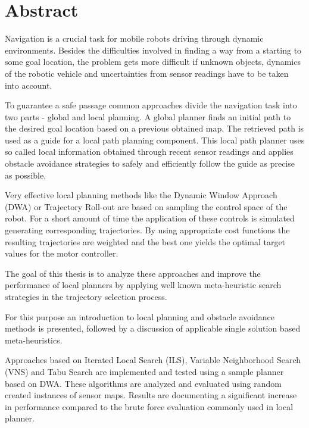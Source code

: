 \begingroup
\let\clearpage\relax
\let\cleardoublepage\relax
\let\cleardoublepage\relax

\chapter*{Abstract}
Navigation is a crucial task for mobile robots driving through dynamic environments.
Besides the difficulties involved in finding a way from a starting to some goal location, the problem gets more difficult if unknown objects, dynamics of the robotic vehicle and uncertainties from sensor readings have to be taken into account.

To guarantee a safe passage common approaches divide the navigation task into two parts - global and local planning.
A global planner finds an initial path to the desired goal location based on a previous obtained map. The retrieved path is used as a guide for a local path planning component.
This local path planner uses so called local information obtained through recent sensor readings and applies obstacle avoidance strategies to safely and efficiently follow the guide as precise as possible. 

Very effective local planning methods like the Dynamic Window Approach (DWA) or Trajectory Roll-out are based on sampling the control space of the robot. 
For a short amount of time the application of these controls is simulated generating corresponding trajectories.
By using appropriate cost functions the resulting trajectories are weighted and the best one yields the optimal target values for the motor controller.

The goal of this thesis is to analyze these approaches and improve the performance of local planners by applying well known meta-heuristic search strategies in the trajectory selection process.

For this purpose an introduction to local planning and obstacle avoidance methods is presented, followed by a discussion of applicable single solution based meta-heuristics. 

Approaches based on Iterated Local Search (ILS), Variable Neighborhood Search (VNS) and Tabu Search are implemented and tested using a sample planner based on DWA. 
These algorithms are analyzed and evaluated using random created instances of sensor maps. Results are documenting a significant increase in performance compared to the brute force evaluation commonly used in local planner. 

